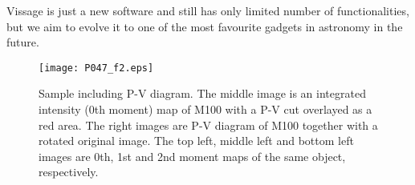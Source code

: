 \documentclass[11pt,twoside]{article}
\begin{document}
Vissage is just a new software and still has only limited number of 
functionalities, but we aim to evolve it to one of the most favourite gadgets 
in astronomy in the future. 

\begin{figure}[tb]
  \centering
  \texttt{[image: P047\_f2.eps]}
  \caption{Sample including P-V diagram. The middle image is an integrated intensity (0th moment) map of M100 with a P-V cut overlayed as a red area. The right images are P-V diagram of M100 together with a rotated original image. The top left, middle left and bottom left images are 0th, 1st and 2nd moment maps of the same object, respectively.}
  \label{fig2}
\end{figure}


\end{document}
